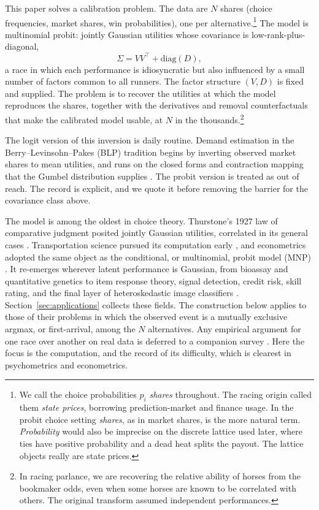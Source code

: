 \documentclass[12pt]{article}
\theoremstyle{remark}
\begin{document}
This paper solves a calibration problem. The data are $N$ shares
(choice frequencies, market shares, win probabilities), one per
alternative.\footnote{We call the choice probabilities $p_i$
\emph{shares} throughout. The racing origin \citep{cotton2021} called
them \emph{state prices}, borrowing prediction-market and finance
usage. In the probit choice setting \emph{shares}, as in market shares,
is the more natural term. \emph{Probability} would also be imprecise on
the discrete lattice used later, where ties have positive probability
and a dead heat splits the payout. The lattice objects really are state
prices.} The model is multinomial probit: jointly Gaussian utilities
whose covariance is low-rank-plus-diagonal,
\[
\Sigma = VV^\top + \mathrm{diag}(D),
\]
a race in which each performance is idiosyncratic but also influenced
by a small number of factors common to all runners. The factor
structure $(V, D)$ is fixed and supplied. The problem is to recover the
utilities at which the model reproduces the shares, together with the
derivatives and removal counterfactuals that make the calibrated model
usable, at $N$ in the thousands.\footnote{In racing parlance, we are
recovering the relative ability of horses from the bookmaker odds, even
when some horses are known to be correlated with others. The original
transform \citep{cotton2021} assumed independent performances.}

The logit version of this inversion is daily routine. Demand estimation
in the Berry--Levinsohn--Pakes (BLP) tradition begins by inverting
observed market shares to mean utilities, and runs on the closed forms
and contraction mapping that the Gumbel distribution supplies
\citep{berry1994,berry1995,conlon2020}. The probit version is treated
as out of reach. The record is explicit, and we quote it before
removing the barrier for the covariance class above.

The model is among the oldest in choice theory. Thurstone's 1927 law
of comparative judgment posited jointly Gaussian utilities, correlated
in its general cases \citep{thurstone1927}. Transportation science
pursued its computation early \citep{daganzo1977}, and econometrics
adopted the same object as the conditional, or multinomial, probit
model (MNP) \citep{hausman1978}. It re-emerges wherever latent
performance is Gaussian, from bioassay and quantitative genetics to
item response theory, signal detection, credit risk, skill rating, and
the final layer of heteroskedastic image classifiers
\citep{collier2021}. Section~\ref{sec:applications} collects these
fields. The construction below applies to those of their problems in
which the observed event is a mutually exclusive argmax, or
first-arrival, among the $N$ alternatives. Any empirical
argument for one race over another on real data is deferred to a
companion survey \citep{cottonsurvey}. Here the focus is the
computation, and the record of its difficulty, which is clearest in
psychometrics and econometrics.
\end{document}
